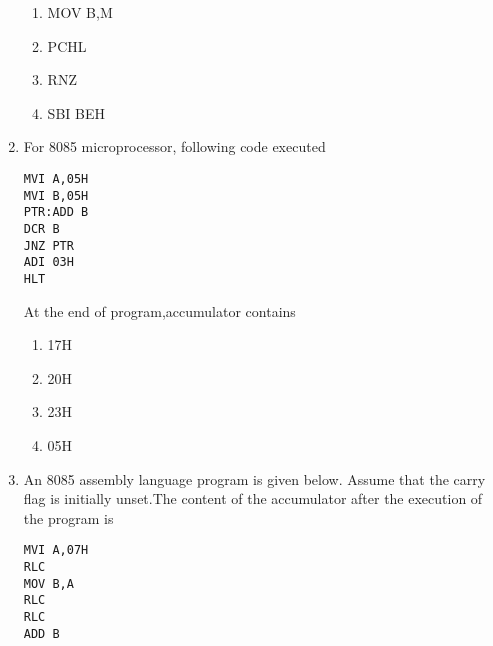 \documentclass[journal,12pt,twocolumn]{IEEEtran}
\begin{document}
\begin{enumerate}
     \begin{enumerate}
      \item MOV B,M 
      \item PCHL
      \item RNZ
      \item SBI BEH
     \end{enumerate}
\item For 8085 microprocessor, following code executed
\begin{verbatim}
MVI A,05H
MVI B,05H
PTR:ADD B
DCR B
JNZ PTR
ADI 03H
HLT
\end{verbatim}
At the end of program,accumulator contains
     \begin{enumerate}
      \item 17H 
      \item 20H
      \item 23H
      \item 05H
    \end{enumerate}
    \item An 8085 assembly language program is given below. Assume that the carry flag is initially unset.The content of the accumulator after the execution of the program is
\begin{verbatim}
MVI A,07H
RLC
MOV B,A
RLC
RLC
ADD B
\end{verbatim}


\end{enumerate}
\end{document}
